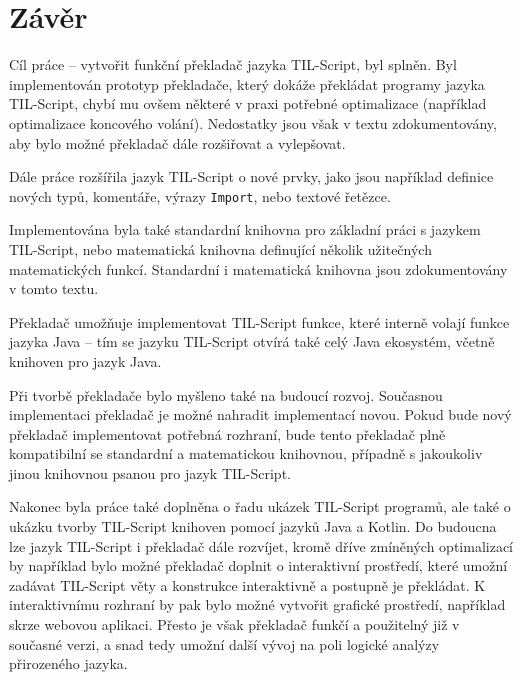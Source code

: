\chapter{Závěr}

Cíl práce -- vytvořit funkční překladač jazyka TIL-Script, byl splněn. Byl implementován prototyp
překladače, který dokáže překládat programy jazyka TIL-Script, chybí mu ovšem některé v praxi
potřebné optimalizace (například optimalizace koncového volání). Nedostatky jsou však v textu
zdokumentovány, aby bylo možné překladač dále rozšiřovat a vylepšovat.

Dále práce rozšířila jazyk TIL-Script o nové prvky, jako jsou například definice nových typů,
komentáře, výrazy \lstinline{Import}, nebo textové řetězce.

Implementována byla také standardní knihovna pro základní práci s jazykem TIL-Script, nebo
matematická knihovna definující několik užitečných matematických funkcí. Standardní i matematická
knihovna jsou zdokumentovány v tomto textu.

Překladač umožňuje implementovat TIL-Script funkce, které interně volají funkce jazyka Java -- tím
se jazyku TIL-Script otvírá také celý Java ekosystém, včetně knihoven pro jazyk Java.

Při tvorbě překladače bylo myšleno také na budoucí rozvoj. Současnou implementaci překladač je možné
nahradit implementací novou. Pokud bude nový překladač implementovat potřebná rozhraní, bude tento
překladač plně kompatibilní se standardní a matematickou knihovnou, případně s jakoukoliv jinou
knihovnou psanou pro jazyk TIL-Script.

Nakonec byla práce také doplněna o řadu ukázek TIL-Script programů, ale také o ukázku tvorby
TIL-Script knihoven pomocí jazyků Java a Kotlin. Do budoucna lze jazyk TIL-Script i překladač dále
rozvíjet, kromě dříve zmíněných optimalizací by například bylo možné překladač doplnit o
interaktivní prostředí, které umožní zadávat TIL-Script věty a konstrukce interaktivně a postupně
je překládat. K interaktivnímu rozhraní by pak bylo možné vytvořit grafické prostředí, například
skrze webovou aplikaci. Přesto je však překladač funkčí a použitelný již v současné verzi, a snad
tedy umožní další vývoj na poli logické analýzy přirozeného jazyka.

\endinput

